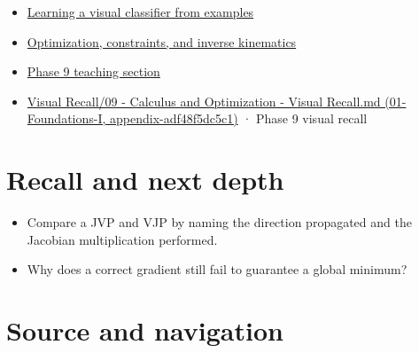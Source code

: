 \begin{itemize}
\tightlist
\item
  \href{Continuous\%20Notes/University\%20-\%20Worlds,\%20Images\%20and\%20Inference\%20-\%20Graphics,\%20Vision\%20and\%20Photography\#Learning\%20a\%20visual\%20classifier\%20from\%20examples}{Learning a visual classifier from examples}
\item
  \href{Continuous\%20Notes/University\%20-\%20Worlds,\%20Images\%20and\%20Inference\%20-\%20Graphics,\%20Vision\%20and\%20Photography\#Optimization,\%20constraints,\%20and\%20inverse\%20kinematics}{Optimization, constraints, and inverse kinematics}
\item
  \href{Continuous\%20Notes/Computing\%20Foundations\%20-\%20From\%20Bits\%20to\%20C++\%20and\%20Systems\%20APIs\#Numerical\%20differentiation\%20and\%20automatic\%20differentiation}{Phase 9 teaching section}
\item
  \href{../01-Foundations-I/main.pdf\#nameddest=appendix-adf48f5dc5c1}{Visual Recall/09 - Calculus and Optimization - Visual Recall.md (01-Foundations-I, appendix-adf48f5dc5c1)} · Phase 9 visual recall
\end{itemize}

\section{Recall and next depth}\label{appendix-40df0855b4a7-recall-and-next-depth}

\begin{itemize}
\tightlist
\item
  Compare a JVP and VJP by naming the direction propagated and the Jacobian multiplication performed.
\item
  Why does a correct gradient still fail to guarantee a global minimum?
\end{itemize}

\section{Source and navigation}\label{appendix-40df0855b4a7-source-and-navigation}

